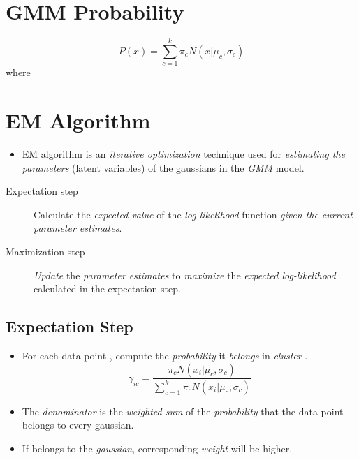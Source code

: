 \documentclass[
	number={6},
	title={Clustering}
]{cs584notes}
\begin{document}
\section{GMM Probability}\label{sec:gmm-probability}
\begin{equation}
	P(x) = \sum_{c=1}^{k} \pi_{c} N(x | \mu_{c}, \sigma_{c})
	\label{eq:gmm-probability}
\end{equation}
where 

\section{EM Algorithm}\label{sec:em-algorithm}
\begin{itemize}
	\item EM algorithm is an \emph{iterative optimization} technique used for \emph{estimating the parameters} (latent variables) of the gaussians in the \emph{GMM} model.
\end{itemize}
\begin{description}
	\item[Expectation step] Calculate the \emph{expected value} of the \emph{log-likelihood} function \emph{given the current parameter estimates}.
	\item[Maximization step] \emph{Update} the \emph{parameter estimates} to \emph{maximize} the \emph{expected log-likelihood} calculated in the expectation step.
\end{description}

\subsection{Expectation Step}\label{subsec:expectation-step}
\begin{itemize}
	\item For each data point , compute the \emph{probability} it \emph{belongs} in \emph{cluster} .
	\begin{equation}
		\gamma_{ic} = \frac{\pi_{c}N(x_{i} | \mu_{c}, \sigma_{c})}{\sum_{c=1}^{k}  \pi_{c}N(x_{i} | \mu_{c}, \sigma_{c})}
		\label{eq:expectation-step}
	\end{equation}
	\item The \emph{denominator} is the \emph{weighted sum} of the \emph{probability} that the data point  belongs to every gaussian.
	\item If  belongs to the  \emph{gaussian}, corresponding \emph{weight}  will be higher.
\end{itemize}
\end{document}
